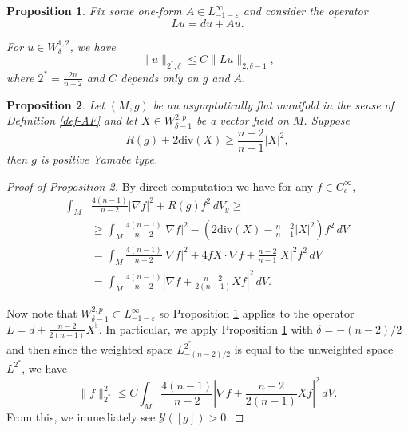 \documentclass[10pt,a4paper]{amsart}
\newtheorem{prop}{Proposition}
\begin{document}
\begin{prop}\label{prop-coerce}
	Fix some one-form $A\in L^\infty_{-1-\varepsilon}$ and consider the operator
	\begin{equation*}
		Lu= du+Au.
	\end{equation*}
	
	For $u\in W^{1,2}_{\delta}$, we have
	\begin{equation}\label{eq-coerce}
		\|u\|_{2^*,\delta}\leq C\|Lu\|_{2,\delta-1},
	\end{equation}
	where $2^*=\frac{2n}{n-2}$ and $C$ depends only on $g$ and $A$.
\end{prop}

\begin{prop}\label{prop-Yamabe}
	Let $(M,g)$ be an asymptotically flat manifold in the sense of Definition \ref{def-AF} and let $X\in W^{2,p}_{\delta-1}$ be a vector field on $M$. Suppose
	\begin{equation}
		R(g)+ 2\mathrm{div}(X)\geq\frac{n-2}{n-1}|X|^2,
	\end{equation}
	then $g$ is positive Yamabe type.
\end{prop}

\begin{proof}[Proof of Proposition \ref{prop-Yamabe}]
	By direct computation we have for any $f\in C^\infty_c$,
	\begin{align*}
		\int_M &\frac{4(n-1)}{n-2}|\nabla f|^2+R(g)f^2\,dV_g\geq \\
		 &\geq \int_M \frac{4(n-1)}{n-2}|\nabla f|^2-\left( 2\mathrm{div}(X)-\frac{n-2}{n-1}|X|^2 \right)f^2\,dV\\
	&=\int_M \frac{4(n-1)}{n-2}|\nabla f|^2+4fX\cdot\nabla f+\frac{n-2}{n-1}|X|^2f^2\,dV\\
	&=\int_M \frac{4(n-1)}{n-2}\left|\nabla f +\frac{n-2}{2(n-1)}Xf   \right|^2\,dV.
	\end{align*}

	Now note that $W^{2,p}_{\delta-1}\subset L^\infty_{-1-\varepsilon}$ so Proposition \ref{prop-coerce} applies to the operator $L=d+\frac{n-2}{2(n-1)}X^\flat$. In particular, we apply Proposition \ref{prop-coerce} with $\delta=-(n-2)/2$ and then since the weighted space $L^{2^*}_{-(n-2)/2}$ is equal to the unweighted space $L^{2^*}$, we have
	\begin{equation*}
		\|f\|^2_{2^*}\leq C \int_M \frac{4(n-1)}{n-2}\left|\nabla f +\frac{n-2}{2(n-1)}Xf   \right|^2\,dV.
	\end{equation*}
	From this, we immediately see $\mathcal Y([g])>0$.
	
\end{proof}
\end{document}
